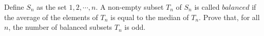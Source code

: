 Define $S_n$ as the set ${1,2,\cdots,n}$. A non-empty subset $T_n$ of $S_n$ is called $balanced$ if the average of the elements of $T_n$ is equal to the median of $T_n$. Prove that, for all $n$,  the number of balanced subsets $T_n$ is odd.
